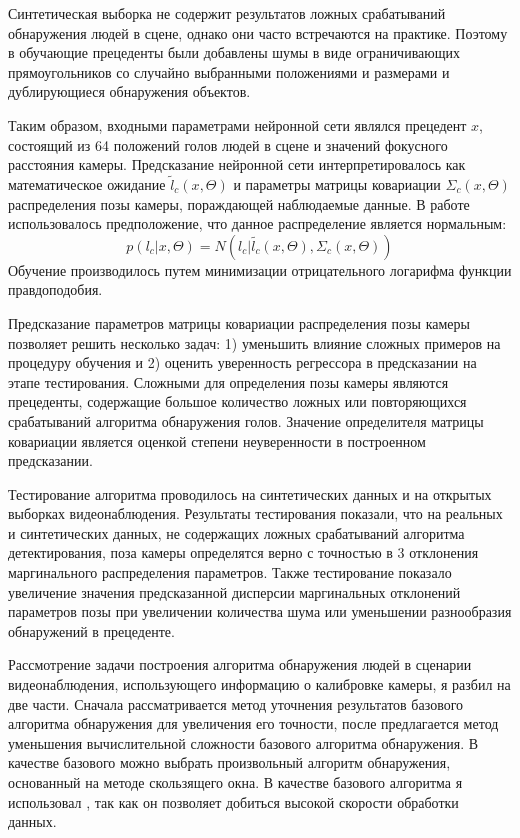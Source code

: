 Синтетическая выборка не содержит результатов ложных срабатываний обнаружения людей в сцене, однако они часто встречаются на практике. Поэтому в обучающие прецеденты были добавлены шумы в виде ограничивающих прямоугольников со случайно выбранными положениями и размерами и дублирующиеся обнаружения объектов.

Таким образом, входными параметрами нейронной сети являлся прецедент $x$, состоящий из 64 положений голов людей в сцене и значений фокусного расстояния камеры. Предсказание нейронной сети интерпретировалось как математическое ожидание $\tilde{l}_c(x, \Theta)$ и параметры матрицы ковариации $\Sigma_c(x, \Theta)$ распределения позы камеры, пораждающей наблюдаемые данные. В работе использовалось предположение, что данное распределение является нормальным:
\begin{equation}
	p(l_{c}|x, \Theta) = N(l_c|\tilde{l_c}(x, \Theta), \Sigma_c(x, \Theta))
\end{equation}
Обучение производилось путем минимизации отрицательного логарифма функции правдоподобия.

Предсказание параметров матрицы ковариации распределения позы камеры позволяет решить несколько задач: 1) уменьшить влияние сложных примеров на процедуру обучения и 2) оценить уверенность регрессора в предсказании на этапе тестирования. Сложными для определения позы камеры являются прецеденты, содержащие большое количество ложных или повторяющихся срабатываний алгоритма обнаружения голов. Значение определителя матрицы ковариации является оценкой степени неуверенности в построенном предсказании.

Тестирование алгоритма проводилось на синтетических данных и на открытых выборках видеонаблюдения. Результаты тестирования показали, что на реальных и синтетических данных, не содержащих ложных срабатываний алгоритма детектирования, поза камеры определятся верно с точностью в 3 отклонения маргинального распределения параметров. Также тестирование показало увеличение значения предсказанной дисперсии маргинальных отклонений параметров позы при увеличении количества шума или уменьшении разнообразия обнаружений в прецеденте.

Рассмотрение задачи построения алгоритма обнаружения людей в сценарии видеонаблюдения, использующего информацию о калибровке камеры, я разбил на две части. Сначала рассматривается метод уточнения результатов базового алгоритма обнаружения для увеличения его точности, после предлагается метод уменьшения вычислительной сложности базового алгоритма обнаружения. В качестве базового можно выбрать произвольный алгоритм обнаружения, основанный на методе скользящего окна. В качестве базового алгоритма я использовал \cite{prisacariu_reid_tr2310_09}, так как он позволяет добиться высокой скорости обработки данных.


